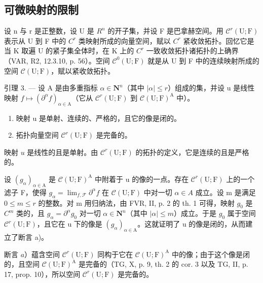 \subsection{可微映射的限制}

设 n 与 r 是正整数，设 U 是 \(R^{n}\) 的开子集，并设 F 是巴拿赫空间。用 \(\mathcal{C}^{r}(\mathrm{U};\mathrm{F})\) 表示从 U 到 F 中的 \(C^{r}\) 类映射所成的向量空间，赋以 \(C^{r}\) 紧收敛拓扑。回忆它是当 K 取遍 U 的紧子集全体时，在 K 上的 \(C^{r}\) 一致收敛拓扑诸拓扑的上确界（VAR, R2, 12.3.10, p. 56）。空间 \(\mathcal{C}^{0}(\mathrm{U};\mathrm{F})\) 就是从 U 到 F 中的连续映射所成的空间 \(\mathcal{C}(\mathrm{U};\mathrm{F})\)，赋以紧收敛拓扑。

引理 3. --- 设 A 是由多重指标 \(\alpha \in \mathbf{N}^n\)（其中 \(|\alpha| \leqslant r\)）组成的集，并设 u 是线性映射 \(f \mapsto (\partial^\alpha f)_{\alpha \in \mathrm{A}}\)（它从 \(\mathcal{C}^r(\mathrm{U};\mathrm{F})\) 到 \(\mathcal{C}(\mathrm{U};\mathrm{F})^{\mathrm{A}}\) 中）。

\begin{enumerate}
\def\labelenumi{\alph{enumi})}
\item
  映射 u 是单射、连续的、严格的，且它的像是闭的。
\item
  拓扑向量空间 \(\mathcal{C}^{r}(\mathrm{U};\mathrm{F})\) 是完备的。
\end{enumerate}

映射 \(u\) 是线性的且是单射。由 \(\mathcal{C}^r (\mathrm{U};\mathrm{F})\) 的拓扑的定义，它是连续的且是严格的。

设 \((g_{\alpha})_{\alpha\in\mathrm{A}}\) 是 \(\mathcal{C}(\mathrm{U};\mathrm{F})^{\mathrm{A}}\) 中附着于 u 的像的一点。存在 \(\mathcal{C}^{r}(\mathrm{U};\mathrm{F})\) 上的一个滤子 F，使得 \(g_{\alpha}=\lim_{f,\mathcal{F}}\partial^{\alpha}f\) 在 \(\mathcal{C}(\mathrm{U};\mathrm{F})\) 中对一切 \(\alpha\in A\) 成立。设 m 是满足 \(0\leqslant m\leqslant r\) 的整数。对 m 用归纳法，由 FVR, II, p. 2 的 th. 1 可得，映射 \(g_{0}\) 是 \(C^{m}\) 类的，且 \(g_{\alpha}=\partial^{\alpha}g_{0}\) 对一切 \(\alpha\in\mathbf{N}^{n}\)（其中 \(|\alpha|\leqslant m\)）成立。于是 \(g_{0}\) 属于空间 \(\mathcal{C}^{r}(\mathrm{U};\mathrm{F})\)，且它在 u 下的像是 \((g_{\alpha})_{\alpha\in\mathrm{A}}\)。这就证明了 u 的像是闭的，从而建立了断言 a)。

断言 \(a\)）蕴含空间 \(\mathcal{C}^{r}(\mathrm{U};\mathrm{F})\) 同构于它在 \(\mathcal{C}(\mathrm{U};\mathrm{F})^{\mathrm{A}}\) 中的像；由于这个像是闭的，且空间 \(\mathcal{C}(\mathrm{U};\mathrm{F})^{\mathrm{A}}\) 是完备的（TG, X, p. 9, th. 2 的 cor. 3 以及 TG, II, p. 17, prop. 10），所以空间 \(\mathcal{C}^{r}(\mathrm{U};\mathrm{F})\) 是完备的。

